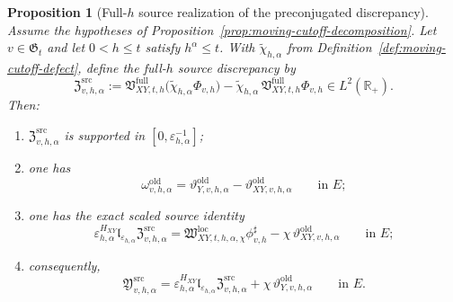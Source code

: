\documentclass[11pt,a4paper]{amsart}
\theoremstyle{plain}
\newtheorem{proposition}[theorem]{Proposition}
\theoremstyle{definition}
\theoremstyle{remark}
\newcommand{\R}{\mathbb{R}}
\begin{document}
\begin{proposition}[Full-\(h\) source realization of the preconjugated discrepancy]
\label{prop:unit-interval-source-full}
Assume the hypotheses of Proposition~\ref{prop:moving-cutoff-decomposition}. Let \(v\in\mathfrak G_t\)
and let \(0<h\le t\) satisfy \(h^\alpha\le t\). With \(\widetilde\chi_{h,\alpha}\) from
Definition~\ref{def:moving-cutoff-defect}, define the full-\(h\) source discrepancy by
\begin{equation}\label{eq:full-h-source-discrepancy}
\mathfrak Z_{v,h,\alpha}^{\mathrm{src}}
:=
\mathfrak V_{XY,t,h}^{\mathrm{full}}
\bigl(
\widetilde\chi_{h,\alpha}\Phi_{v,h}
\bigr)
-
\widetilde\chi_{h,\alpha}\,
\mathfrak V_{XY,t,h}^{\mathrm{full}}\Phi_{v,h}
\in L^2(\R_+).
\end{equation}
Then:
\begin{enumerate}[label=(\roman*)]
\item \(\mathfrak Z_{v,h,\alpha}^{\mathrm{src}}\) is supported in \([0,\varepsilon_{h,\alpha}^{-1}]\);
\item one has
\begin{equation}\label{eq:unit-interval-old-tail-split}
\omega_{v,h,\alpha}^{\mathrm{old}}
=
\vartheta_{Y,v,h,\alpha}^{\mathrm{old}}
-
\vartheta_{XY,v,h,\alpha}^{\mathrm{old}}
\qquad\text{in }E;
\end{equation}
\item one has the exact scaled source identity
\begin{equation}\label{eq:full-h-source-discrepancy-local}
\varepsilon_{h,\alpha}^{H_{XY}}
\mathfrak l_{\varepsilon_{h,\alpha}}
\mathfrak Z_{v,h,\alpha}^{\mathrm{src}}
=
\mathfrak W_{XY,t,h,\alpha,\chi}^{\mathrm{loc}}\phi_{v,h}^{\sharp}
-
\chi\,\vartheta_{XY,v,h,\alpha}^{\mathrm{old}}
\qquad\text{in }E;
\end{equation}
\item consequently,
\begin{equation}\label{eq:unit-interval-source-preconj-split}
\mathfrak Y_{v,h,\alpha}^{\mathrm{src}}
=
\varepsilon_{h,\alpha}^{H_{XY}}
\mathfrak l_{\varepsilon_{h,\alpha}}
\mathfrak Z_{v,h,\alpha}^{\mathrm{src}}
+
\chi\,\vartheta_{Y,v,h,\alpha}^{\mathrm{old}}
\qquad\text{in }E.
\end{equation}
\end{enumerate}
\end{proposition}
\end{document}
